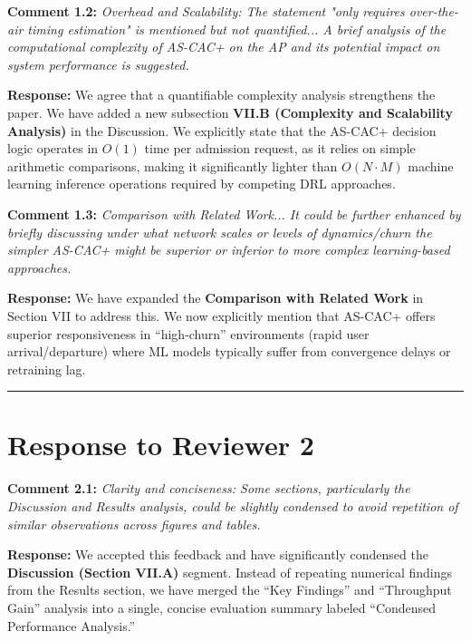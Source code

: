 \documentclass[11pt]{article}
\begin{document}
\noindent \textbf{Comment 1.2:} \textit{Overhead and Scalability: The statement "only requires over-the-air timing estimation" is mentioned but not quantified... A brief analysis of the computational complexity of AS-CAC+ on the AP and its potential impact on system performance is suggested.}

\noindent \textbf{Response:} We agree that a quantifiable complexity analysis strengthens the paper. We have added a new subsection \textbf{VII.B (Complexity and Scalability Analysis)} in the Discussion. We explicitly state that the AS-CAC+ decision logic operates in $O(1)$ time per admission request, as it relies on simple arithmetic comparisons, making it significantly lighter than $O(N \cdot M)$ machine learning inference operations required by competing DRL approaches.

\vspace{0.3cm}

\noindent \textbf{Comment 1.3:} \textit{Comparison with Related Work... It could be further enhanced by briefly discussing under what network scales or levels of dynamics/churn the simpler AS-CAC+ might be superior or inferior to more complex learning-based approaches.}

\noindent \textbf{Response:} We have expanded the \textbf{Comparison with Related Work} in Section VII to address this. We now explicitly mention that AS-CAC+ offers superior responsiveness in ``high-churn'' environments (rapid user arrival/departure) where ML models typically suffer from convergence delays or retraining lag.

\vspace{0.5cm}
\hrule
\vspace{0.5cm}

\section*{Response to Reviewer 2}

\noindent \textbf{Comment 2.1:} \textit{Clarity and conciseness: Some sections, particularly the Discussion and Results analysis, could be slightly condensed to avoid repetition of similar observations across figures and tables.}

\noindent \textbf{Response:} We accepted this feedback and have significantly condensed the \textbf{Discussion (Section VII.A)} segment. Instead of repeating numerical findings from the Results section, we have merged the ``Key Findings'' and ``Throughput Gain'' analysis into a single, concise evaluation summary labeled ``Condensed Performance Analysis.''
\end{document}
